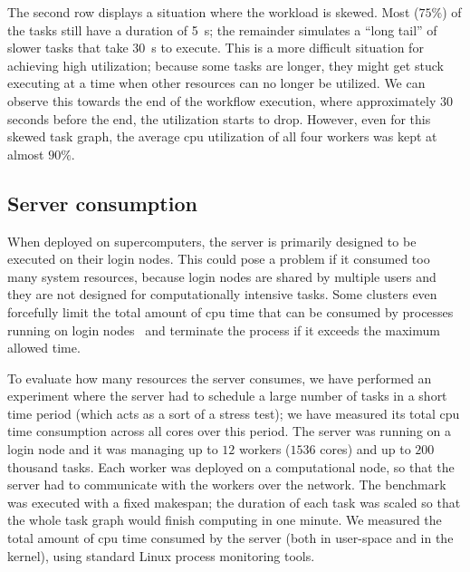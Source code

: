 The second row displays a situation where the workload is skewed. Most ($75\%$) of
the tasks still have a duration of \SI{5}{\second}; the remainder simulates a ``long tail''
of slower tasks that take \SI{30}{\second} to execute. This is a more difficult situation
for achieving high utilization; because some tasks are longer, they might get stuck executing at a
time when other resources can no longer be utilized. We can observe this towards the end of the
workflow execution, where approximately $30$ seconds before the end, the
utilization starts to drop. However, even for this skewed task graph, the average
\gls{cpu} utilization of all four workers was kept at almost $90\%$.

\subsection{Server  consumption}
\label{sec:hq-exp-server-cpu-consumption}
When deployed on supercomputers, the \hyperqueue{} server is primarily designed to be
executed on their login nodes. This could pose a problem if it consumed too many system
resources, because login nodes are shared by multiple users and they are not designed for
computationally intensive tasks. Some clusters even forcefully limit the total amount of
\gls{cpu} time that can be consumed by processes running on login
nodes~\cite{leonardo_time_limit} and terminate the process if it exceeds the maximum allowed time.

To evaluate how many resources the server consumes, we have performed an experiment where the
server had to schedule a large number of tasks in a short time period (which acts as a sort of a
stress test); we have measured its total \gls{cpu} time consumption across all cores over this
period. The server was running on a login node and it was managing up to $12$ workers
($1536$ cores) and up to $200$ thousand tasks. Each worker was
deployed on a computational node, so that the server had to communicate with the workers over the
network. The benchmark was executed with a fixed makespan; the duration of each task was scaled so
that the whole task graph would finish computing in one minute. We measured the total amount of
\gls{cpu} time consumed by the server (both in user-space and in the kernel), using
standard Linux process monitoring tools.

